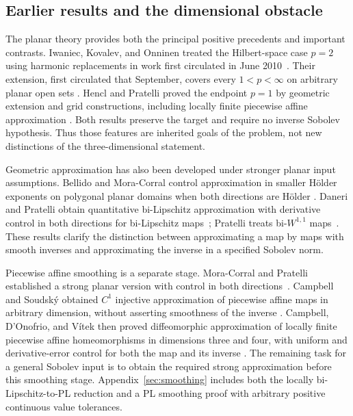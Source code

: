 \subsection{Earlier results and the dimensional obstacle}

The planar theory provides both the principal positive precedents and
important contrasts.  Iwaniec, Kovalev, and Onninen treated the
Hilbert-space case $p=2$ using harmonic replacements in work first
circulated in June 2010~\cite{IwaniecKovalevOnninen2012}.  Their extension,
first circulated that September, covers every $1<p<\infty$ on arbitrary planar open sets
\cite[Theorem~1.1]{IwaniecKovalevOnninen2011}.  Hencl and Pratelli
proved the endpoint $p=1$ by geometric extension and grid constructions,
including locally finite piecewise affine approximation
\cite[Theorem~1.1]{HenclPratelli2018}.  Both results preserve the
target and require no inverse Sobolev hypothesis.  Thus those features
are inherited goals of the problem, not new distinctions of the
three-dimensional statement.

Geometric approximation has also been developed under stronger planar
input assumptions.  Bellido and Mora-Corral control approximation in
smaller H\"older exponents on polygonal planar domains when both
directions are H\"older
\cite{BellidoMoraCorral2011}.  Daneri and Pratelli obtain quantitative
bi-Lipschitz approximation with derivative control in both directions
for bi-Lipschitz maps~\cite{DaneriPratelli2014}; Pratelli treats
bi-$W^{1,1}$ maps~\cite{Pratelli2017}.  These results clarify the
distinction between approximating a map by maps with smooth inverses
and approximating the inverse in a specified Sobolev norm.

Piecewise affine smoothing is a separate stage.  Mora-Corral and
Pratelli established a strong planar version with control in both
directions~\cite{MoraCorralPratelli2014}.  Campbell and Soudsk\'y
obtained $C^1$ injective approximation of piecewise affine maps in
arbitrary dimension, without asserting smoothness of the inverse
\cite{CampbellSoudsky2021}.  Campbell, D'Onofrio, and V\'itek then
proved diffeomorphic approximation of locally finite piecewise affine
homeomorphisms in dimensions three and four, with uniform and
derivative-error control for both the map and its inverse
\cite[Theorem~A]{CampbellDOnofrioVitek2026}.  The remaining task for a
general Sobolev input is to obtain the required strong approximation
before this smoothing stage.  Appendix~\ref{sec:smoothing} includes
both the locally bi-Lipschitz-to-PL reduction and a PL smoothing proof
with arbitrary positive continuous value tolerances.

